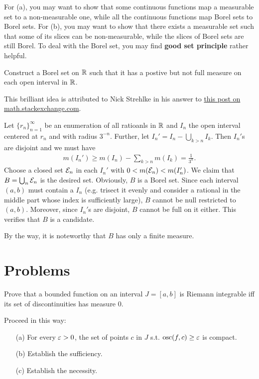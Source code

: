 \begin{hint}
  For (a), you may want to show that some continuous functions map a measurable set to a non-measurable one, while all the continuous functions map Borel sets to Borel sets.
  For (b), you may want to show that there exists a measurable set such that some of its slices can be non-measurable, while the slices of Borel sets are still Borel.
  To deal with the Borel set, you may find \textbf{good set principle} rather helpful.
\end{hint}

\begin{Exercise}[36]
  Construct a Borel set on $\mathbb{R}$ such that it has a postive but not full measure on each open interval in $\mathbb{R}$.
\end{Exercise}

\begin{remark}
  This brilliant idea is attributed to Nick Strehlke in his answer to \href{https://math.stackexchange.com/questions/57317/construction-of-a-borel-set-with-positive-but-not-full-measure-in-each-interval}{this post on math.stackexchange.com}.
\end{remark}

\begin{Solution}
  Let $\{r_n\}_{n=1}^\infty$ be an enumeration of all ratioanls in $\mathbb{R}$ and $I_n$ the open interval centered at $r_n$ and with radius $3^{-n}$. Further, let $I_n'=I_n-\bigcup_{k>n}I_k$. Then $I_n'$s are disjoint and we must have
  \begin{align*}
    m(I_n')\geq m(I_n)-\sum_{k>n}m(I_k)=\frac1{3^n}.
  \end{align*}
  Choose a closed set $\mathcal{E}_n$ in each $I_n'$ with $0<m(\mathcal{E}_n)<m(I_n')$. We claim that $B=\bigcup_{n}\mathcal{E}_n$ is the desired set. Obviously, $B$ is a Borel set. Since each interval $(a,b)$ must contain a $I_n$ (e.g. trisect it evenly and consider a rational in the middle part whose index is sufficiently large), $B$ cannot be null restricted to $(a,b)$. Moreover, since $I_n'$s are disjoint, $B$ cannot be full on it either. This verifies that $B$ is a candidate.

  By the way, it is noteworthy that $B$ has only a finite measure.
\end{Solution}

\section{Problems}
\begin{Problem}[4]
  Prove that a bounded function on an interval $J=[a,b]$ is Riemann integrable iff its set of discontinuities has measure 0. 
  
  Proceed in this way:
  \begin{itemize}
    \item [(a)] For every $\varepsilon>0$, the set of points $c$ in $J$ s.t. $\text{osc}(f,c)\geq\varepsilon$ is compact.
    \item [(b)] Establish the sufficiency.
    \item [(c)] Establish the necessity.
  \end{itemize}
\end{Problem}

